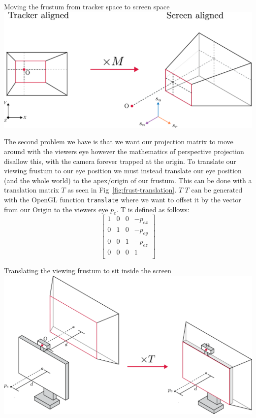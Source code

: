 \begin{figureBox}[label={fig:basis-change}, width=0.8\linewidth]{Moving the frustum from tracker space to screen space}
    \includegraphics[width = 0.8\linewidth]{./background/figures/projection/realignment.pdf}
\end{figureBox}

The second problem we have is that we want our projection matrix to move around with the viewers eye however the mathematics of perspective projection disallow this, with the camera forever trapped at the origin. To translate our viewing frustum to our eye position we must instead translate our eye position (and the whole world) to the apex/origin of our frustum. This can be done with a translation matrix $T$ as seen in Fig~\ref{fig:frust-translation}. $T$ $T$ can be generated with the OpenGL function \texttt{translate} where we want to offset it by the vector from our Origin to the viewers eye $p_e$. T is defined as follows:
\[
    \begin{bmatrix}
        1 & 0 & 0 & -p_{ex} \\
        0 & 1 & 0 & -p_{ey} \\
        0 & 0 & 1 & -p_{ez} \\
        0 & 0 & 0 & 1       \\
    \end{bmatrix}
\]

\begin{figureBox}[label={fig:frust-translation}, width=0.8\linewidth]{Translating the viewing frustum to sit inside the screen}
    \includegraphics[width = 0.8\linewidth]{./background/figures/projection/frust-translation.pdf}
\end{figureBox}

